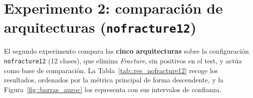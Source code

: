\section{Experimento 2: comparación de arquitecturas (\texttt{nofracture12})}
\label{sec::res_arquitecturas}

El segundo experimento compara las \textbf{cinco arquitecturas} sobre la configuración
\texttt{nofracture12} (12 clases), que elimina \textit{Fracture}, sin positivos en el
test, y actúa como base de comparación. La Tabla~\ref{tab::res_nofracture12} recoge los
resultados, ordenados por la métrica principal de forma descendente, y la
Figura~\ref{fig::barras_auroc} los representa con sus intervalos de confianza.

\begin{table}[h]
\centering
\setlength{\tabcolsep}{3pt}\scriptsize
{}
\caption{Resultados del Experimento 2 (\texttt{nofracture12}, 12 clases) en el test
\textit{silver-standard} (169 imágenes), con intervalos de confianza \textit{bootstrap}
al 95\,\%. En negrita, el mejor valor de cada columna.}
\label{tab::res_nofracture12}
\end{table}


